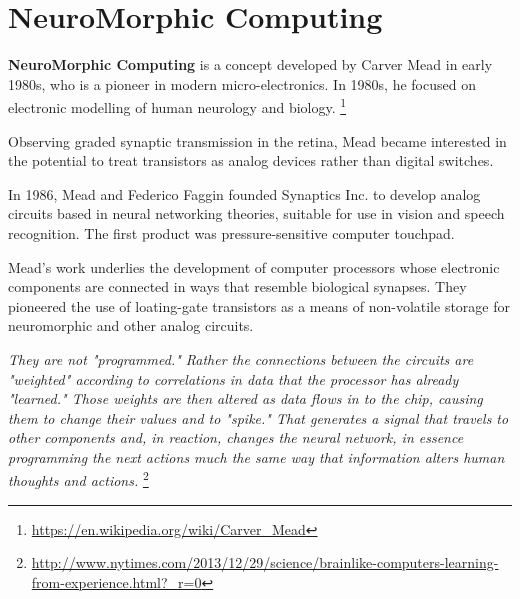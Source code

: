 \chapter{NeuroMorphic Computing}
\label{chap:NeuroMorphic-Computing}


{\bf NeuroMorphic Computing} is a concept developed by Carver Mead in early
1980s, who is a pioneer in modern micro-electronics. In 1980s, he focused on
electronic modelling of human neurology and biology.
\footnote{\url{https://en.wikipedia.org/wiki/Carver_Mead}}
 
Observing graded synaptic transmission in the retina, Mead became interested in
the potential to treat transistors as analog devices rather than digital
switches.

In 1986, Mead and Federico Faggin founded Synaptics Inc. to develop analog
circuits based in neural networking theories, suitable for use in vision and
speech recognition.  The first product was pressure-sensitive computer touchpad.

Mead's work underlies the development of computer processors whose electronic
components are connected in ways that resemble biological synapses.
They pioneered the use of loating-gate transistors as a means of non-volatile
storage for neuromorphic and other analog circuits.

{\it They are not "programmed." Rather the connections between the circuits are
"weighted" according to correlations in data that the processor has already
"learned." Those weights are then altered as data flows in to the chip, causing
them to change their values and to "spike." That generates a signal that travels
to other components and, in reaction, changes the neural network, in essence
programming the next actions much the same way that information alters human
thoughts and actions. }
\footnote{\url{http://www.nytimes.com/2013/12/29/science/brainlike-computers-learning-from-experience.html?_r=0}}


